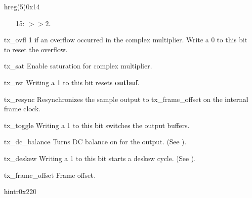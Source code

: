 \documentclass[11pt,technote,a4paper,onecolumn,dvips]{IEEEtran}
\newcommand{\module}[1]{{\ttfamily\bfseries #1}}
\begin{document}
\begin{register}{h}{reg(5)}{0x14}
\begin{regdesc}
\begin{reglist}
\begin{itemize}
                \item[15:] $>> 2$.
            \end{itemize}
        \item[tx\_ovfl] 1 if an overflow occurred in the complex multiplier.
            Write a 0 to this bit to reset the overflow.
        \item[tx\_sat] Enable saturation for complex multiplier.
        \item[tx\_rst] Writing a 1 to this bit resets \module{outbuf}.
        \item[tx\_resync] Resynchronizes the sample output to
            tx\_frame\_offset on the internal frame clock.
        \item[tx\_toggle] Writing a 1 to this bit switches the output buffers.
        \item[tx\_dc\_balance] Turns DC balance on for the output. (See
            \cite[p. 11]{ds90cr485}).
        \item[tx\_deskew] Writing a 1 to this bit starts a deskew cycle. (See
            \cite[p. 12f]{ds90cr485}).
        \item[tx\_frame\_offset] Frame offset.
    \end{reglist}\end{regdesc}
\end{register}
\begin{register}{h}{intr}{0x220}%
    \label{intr}%
    \regnewline%
\end{register}

\clearpage
\end{document}
